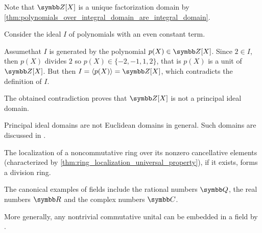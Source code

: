 \begin{example}
\begin{description}
    Note that \( \Z[X] \) is a unique factorization domain by \cref{thm:polynomials_over_integral_domain_are_integral_domain}.

    Consider the ideal \( I \) of polynomials with an even constant term.

    Assume\LEM that \( I \) is generated by the polynomial \( p(X) \in \Z[X] \). Since \( 2 \in I \), then \( p(X) \) divides \( 2 \) so \( p(X) \in \{ -2, -1, 1, 2 \} \), that is \( p(X) \) is a unit of \( \Z[X] \). But then \( I = \Gen{p(X)} = \Z[X] \), which contradicts the definition of \( I \).

    The obtained contradiction proves that \( \Z[X] \) is not a principal ideal domain.

     Principal ideal domains are not Euclidean domains in general. Such domains are discussed in \cite{Anderson1986}.

     The localization of a noncommutative ring over its nonzero cancellative elements (characterized by \cref{thm:ring_localization_universal_property}), if it exists, forms a division ring.

     The canonical examples of fields include the rational numbers \( \Q \), the real numbers \( \R \) and the complex numbers \( \C \).

    More generally, any nontrivial commutative unital can be embedded in a field by .
  \end{description}
\end{example}

